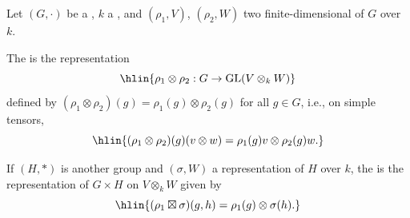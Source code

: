 \begin{definition} \label{definition:tensor_product_of_two_representations_of_a_group_over_a_field}

    Let $(G, \cdot)$ be a , $k$ a , and $(\rho_1, V)$, $(\rho_2, W)$ two finite-dimensional  of $G$ over $k$.

    The  is the representation
    $$\hlin{\rho_1 \otimes \rho_2 : G \to \mathrm{GL}(V \otimes_k W)}$$
    defined by $(\rho_1 \otimes \rho_2)(g) = \rho_1(g) \otimes \rho_2(g)$ for all $g \in G$, i.e., on simple tensors,
    $$\hlin{(\rho_1 \otimes \rho_2)(g)(v \otimes w) = \rho_1(g)v \otimes \rho_2(g)w.}$$

    If $(H, *)$ is another group and $(\sigma, W)$ a representation of $H$ over $k$, the  is the representation of $G \times H$ on $V \otimes_k W$ given by
    $$\hlin{(\rho_1 \boxtimes \sigma)(g, h) = \rho_1(g) \otimes \sigma(h).}$$
\end{definition}
